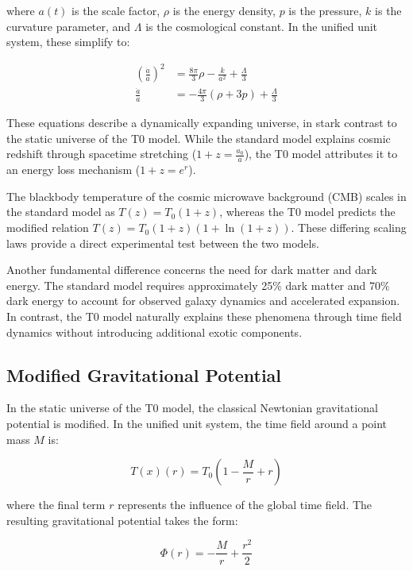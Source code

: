 \documentclass[12pt,a4paper]{article}
\newcommand{\Tfield}{T(x)}
\newcommand{\Tzero}{T_0}
\begin{document}
	where \(a(t)\) is the scale factor, \(\rho\) is the energy density, \(p\) is the pressure, \(k\) is the curvature parameter, and \(\Lambda\) is the cosmological constant. In the unified unit system, these simplify to:
	
	\begin{align}
		\left(\frac{\dot{a}}{a}\right)^2 &= \frac{8\pi}{3}\rho - \frac{k}{a^2} + \frac{\Lambda}{3} \\
		\frac{\ddot{a}}{a} &= -\frac{4\pi}{3}(\rho + 3p) + \frac{\Lambda}{3}
	\end{align}
	
	These equations describe a dynamically expanding universe, in stark contrast to the static universe of the T0 model. While the standard model explains cosmic redshift through spacetime stretching (\(1+z = \frac{a_0}{a}\)), the T0 model attributes it to an energy loss mechanism (\(1+z = e^r\)).
	
	The blackbody temperature of the cosmic microwave background (CMB) scales in the standard model as \(T(z) = T_0(1+z)\), whereas the T0 model predicts the modified relation \(T(z) = T_0(1+z)(1+\ln(1+z))\). These differing scaling laws provide a direct experimental test between the two models.
	
	Another fundamental difference concerns the need for dark matter and dark energy. The standard model requires approximately 25\% dark matter and 70\% dark energy to account for observed galaxy dynamics and accelerated expansion. In contrast, the T0 model naturally explains these phenomena through time field dynamics without introducing additional exotic components.
	
	\subsection{Modified Gravitational Potential}
	In the static universe of the T0 model, the classical Newtonian gravitational potential is modified. In the unified unit system, the time field around a point mass \(M\) is:
	
	\begin{equation}
		\Tfield(r) = \Tzero\left(1 - \frac{M}{r} + r\right)
	\end{equation}
	
	where the final term \(r\) represents the influence of the global time field. The resulting gravitational potential takes the form:
	
	\begin{equation}
		\Phi(r) = -\frac{M}{r} + \frac{r^2}{2}
	\end{equation}
	
\end{document}
